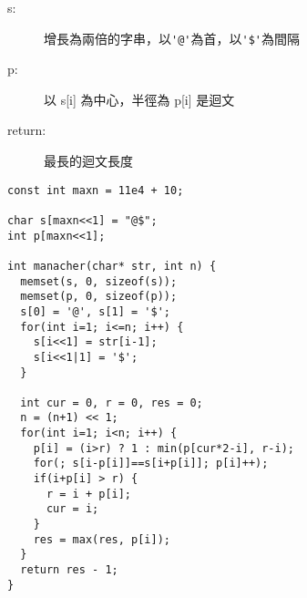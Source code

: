 \begin{description}
    \item [s:] 增長為兩倍的字串，以\verb|'@'|為首，以\verb|'$'|為間隔
    \item [p:] 以 s[i] 為中心，半徑為 p[i] 是迴文
    \item [return:] 最長的迴文長度
\end{description}

\begin{lstlisting}
const int maxn = 11e4 + 10;

char s[maxn<<1] = "@$";
int p[maxn<<1];

int manacher(char* str, int n) {
  memset(s, 0, sizeof(s));
  memset(p, 0, sizeof(p));
  s[0] = '@', s[1] = '$';
  for(int i=1; i<=n; i++) {
    s[i<<1] = str[i-1];
    s[i<<1|1] = '$';
  }

  int cur = 0, r = 0, res = 0;
  n = (n+1) << 1;
  for(int i=1; i<n; i++) {
    p[i] = (i>r) ? 1 : min(p[cur*2-i], r-i);
    for(; s[i-p[i]]==s[i+p[i]]; p[i]++);
    if(i+p[i] > r) {
      r = i + p[i];
      cur = i;
    }
    res = max(res, p[i]);
  }
  return res - 1;
}
\end{lstlisting}
